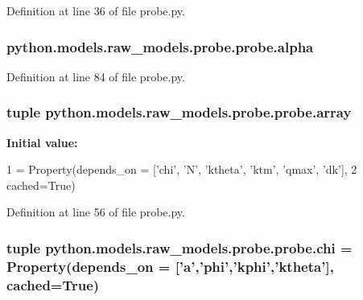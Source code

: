 Definition at line 36 of file probe.\-py.

\hypertarget{classpython_1_1models_1_1raw__models_1_1probe_1_1probe_ab2d3ba66e319cb781f0a951059ede4b9}{
\subsubsection[{alpha}]{\setlength{\rightskip}{0pt plus 5cm}python.\-models.\-raw\-\_\-models.\-probe.\-probe.\-alpha}}\label{classpython_1_1models_1_1raw__models_1_1probe_1_1probe_ab2d3ba66e319cb781f0a951059ede4b9}


Definition at line 84 of file probe.\-py.

\hypertarget{classpython_1_1models_1_1raw__models_1_1probe_1_1probe_a9eecd1aefbd2d8d3d0b3e0ad98b8aa37}{
\subsubsection[{array}]{\setlength{\rightskip}{0pt plus 5cm}tuple python.\-models.\-raw\-\_\-models.\-probe.\-probe.\-array\hspace{0.3cm}{\ttfamily [static]}}}\label{classpython_1_1models_1_1raw__models_1_1probe_1_1probe_a9eecd1aefbd2d8d3d0b3e0ad98b8aa37}
{\bfseries Initial value\-:}
\begin{DoxyCode}
1 = Property(depends\_on = [\textcolor{stringliteral}{'chi'}, \textcolor{stringliteral}{'N'}, \textcolor{stringliteral}{'ktheta'}, \textcolor{stringliteral}{'ktm'}, \textcolor{stringliteral}{'qmax'}, \textcolor{stringliteral}{'dk'}], 
2                      cached=\textcolor{keyword}{True})
\end{DoxyCode}


Definition at line 56 of file probe.\-py.

\hypertarget{classpython_1_1models_1_1raw__models_1_1probe_1_1probe_ab9a644be4549fd78acceaf0687811850}{
\subsubsection[{chi}]{\setlength{\rightskip}{0pt plus 5cm}tuple python.\-models.\-raw\-\_\-models.\-probe.\-probe.\-chi = Property(depends\-\_\-on = \mbox{[}'{\bf a}','{\bf phi}','{\bf kphi}','{\bf ktheta}'\mbox{]}, cached=True)\hspace{0.3cm}{\ttfamily [static]}}}\label{classpython_1_1models_1_1raw__models_1_1probe_1_1probe_ab9a644be4549fd78acceaf0687811850}


